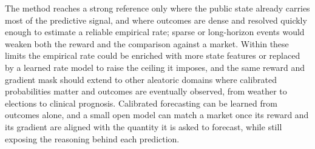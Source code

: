 The method reaches a strong reference only where the public state already carries most of the predictive
signal, and where outcomes are dense and resolved quickly enough to estimate a reliable empirical rate;
sparse or long-horizon events would weaken both the reward and the comparison against a market. Within
these limits the empirical rate could be enriched with more state features or replaced by a learned rate
model to raise the ceiling it imposes, and the same reward and gradient mask should extend to other
aleatoric domains where calibrated probabilities matter and outcomes are eventually observed, from
weather to elections to clinical prognosis. Calibrated forecasting can be learned from outcomes alone,
and a small open model can match a market once its reward and its gradient are aligned with the quantity
it is asked to forecast, while still exposing the reasoning behind each prediction.
